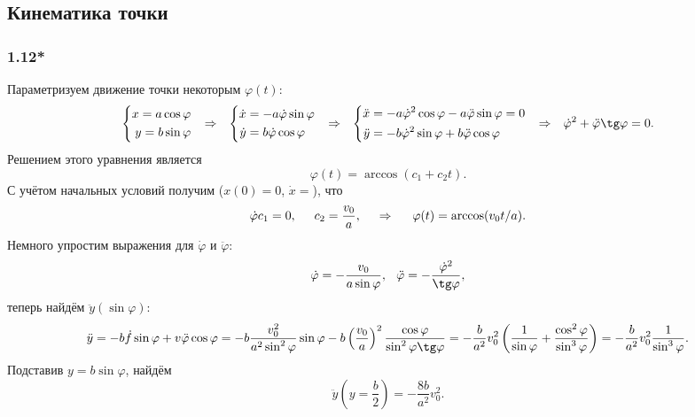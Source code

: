 \subsection{Кинематика точки}

\subsubsection*{1.12*}
Параметризуем движение точки некоторым $\varphi(t)$:
\begin{equation}
\label{strsin}
    \left\{\begin{aligned}
        x =  a \cos \varphi\\ 
        y =  b \sin \varphi
    \end{aligned}\right. 
    \hspace{0.25cm} \Rightarrow \hspace{0.25cm} 
    \left\{\begin{aligned}
        \dot{x} &= - a \dot{\varphi} \sin \varphi \\
        \dot{y} &= b \dot{\varphi} \cos \varphi
    \end{aligned}\right.
    \hspace{0.25cm} \Rightarrow \hspace{0.25cm} 
    \left\{\begin{aligned}
        \ddot{x} &= -a \dot{\varphi}^2 \cos \varphi - a \ddot{\varphi} \sin \varphi = 0 \\
        \ddot{y} &= -b \dot{\varphi}^2 \sin \varphi + b \ddot{\varphi} \cos \varphi 
    \end{aligned}\right.
    \hspace{0.25cm} \Rightarrow \hspace{0.25cm} 
    \dot{\varphi}^2 + \ddot{\varphi} \tg \varphi = 0.
\end{equation}
Решением этого уравнения является
$$
    \varphi(t) = \arccos (c_1 + c_2 t).
$$
С учётом начальных условий получим ($x(0)=0$, $\dot{x} = $), что
$$
    \dot{\varphi} 
    c_1 = 0,\hspace{0.5cm} c_2 = \frac{v_0}{a},
    \hspace{0.5cm} \Rightarrow \hspace{0.5cm} 
    \varphi(t) = \arccos (v_0 t / a).
$$
Немного упростим выражения для $\dot{\varphi}$ и $\ddot{\varphi}$:
$$
    \dot{\varphi} = -\frac{v_0}{a \sin \varphi}, \hspace{0.25cm} 
    \ddot{\varphi} = - \frac{\dot{\varphi}^2}{\tg \varphi},
$$
теперь найдём $\ddot{y} (\sin \varphi)$:
$$
    \ddot{y} = - b \dot{f} \sin \varphi + v \ddot{\varphi} \cos \varphi =
    -b \frac{v_0^2}{a^2 \sin^2 \varphi} \sin \varphi - b \left(\frac{v_0}{a} \right)^2 \frac{\cos \varphi}{\sin^2 \varphi \tg \varphi} = 
    - \frac{b}{a^2} v_0^2 \left(\frac{1}{\sin \varphi} + \frac{\cos^2 \varphi}{\sin^3 \varphi} \right) = -\frac{b}{a^2} v_0^2 \frac{1}{\sin^3 \varphi}.
$$ 
Подставив $y = b \sin \varphi$, найдём
$$
    \ddot{y}\left(y = \frac{b}{2} \right) = -\frac{8b}{a^2} v_0^2. 
$$

